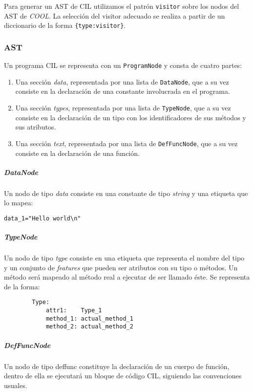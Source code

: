 \documentclass[a4paper,10pt,twocolumn]{article}
\begin{document}
Para generar un AST de CIL utilizamos el patrón \lstinline|visitor| sobre los nodos del AST de \textit{COOL}. La selección del visitor adecuado se realiza a partir de un diccionario de la forma \lstinline|{type:visitor}|.

\subsubsection{AST}

Un programa CIL se representa con un \lstinline|ProgramNode| y consta de cuatro partes:

\begin{enumerate}
	\item Una sección \textit{data}, representada por una lista de \lstinline|DataNode|, que a su vez consiste en la declaración de una constante involucrada en el programa. 
	\item Una sección \textit{types}, representada por una lista de \lstinline|TypeNode|, que a su vez consiste en la declaración de un tipo con los identificadores de sus métodos y sus atributos. 
	\item Una sección \textit{text}, representada por una lista de \lstinline|DefFuncNode|, que a su vez consiste en la declaración de una función.
\end{enumerate}

\subparagraph{DataNode}

Un nodo de tipo \textit{data} consiste en una constante de tipo \textit{string} y una etiqueta que lo mapea:

\begin{center}
	\lstinline|data_1="Hello world\n"|
\end{center}

\subparagraph{TypeNode}

Un nodo de tipo \textit{type} consiste en una etiqueta que representa el nombre del tipo y un conjunto de \textit{features} que pueden ser atributos con su tipo o métodos. Un método será mapeado al método real a ejecutar de ser llamado éste. Se representa de la forma:

\begin{center}
	\begin{lstlisting}
		Type:
			attr1: 	  Type_1
			method_1: actual_method_1
			method_2: actual_method_2
	\end{lstlisting}
\end{center}

\subparagraph{DefFuncNode}
Un nodo de tipo {deffunc} constituye la declaración de un cuerpo de función, dentro de ella se ejecutará un bloque de código CIL, siguiendo las convenciones usuales. 
\end{document}
